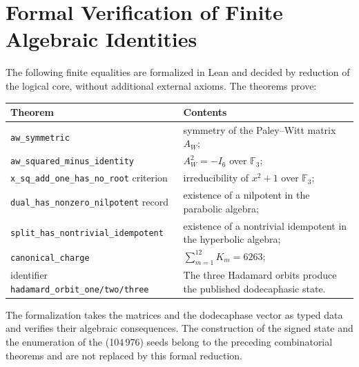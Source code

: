 \chapter{Formal Verification of Finite Algebraic Identities}
\label{app:lean}

The following finite equalities are formalized in Lean and decided by
reduction of the logical core, without additional external axioms. The theorems
prove:
\begin{longtable}{p{}p{}}
\toprule
Theorem & Contents\\
\midrule
\endhead
\texttt{aw\_symmetric}
& symmetry of the Paley--Witt matrix \(A_W\);\\
\texttt{aw\_squared\_minus\_identity}
& \(A_W^2=-I_6\) over \(\mathbb F_3\);\\
\texttt{x\_sq\_add\_one\_has\_no\_root} criterion
& irreducibility of \(x^2+1\) over \(\mathbb F_3\);\\
\texttt{dual\_has\_nonzero\_nilpotent} record
& existence of a nilpotent in the parabolic algebra;\\
\texttt{split\_has\_nontrivial\_idempotent}
& existence of a nontrivial idempotent in the hyperbolic algebra;\\
\texttt{canonical\_charge}
& \(\sum_{m=1}^{12}K_m=6263\);\\
identifier \texttt{hadamard\_orbit\_one/two/three}
& The three Hadamard orbits produce the published dodecaphasic state.\\
\bottomrule
\end{longtable}

The formalization takes the matrices and the dodecaphase vector as typed
data and verifies their algebraic consequences. The construction of the
signed state and the enumeration of the (104\,976) seeds belong to the preceding
combinatorial theorems and are not replaced by this formal reduction.
